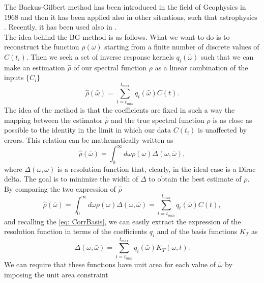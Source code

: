 \documentclass[a4paper,10pt]{article}
\begin{document}
The Backus-Gilbert method \cite{BG} has been introduced in the field of Geophysics in 1968  and then it has been applied also in other situations, such that astrophysics \cite{LoredoEpstein}. Recently, it has been used also in  \cite{Hansen}\cite{Brandt2015}\cite{Brandt2016}.\\
The idea behind the BG method is as follows. What we want to do is to reconstruct the function $\rho(\omega)$ starting from a finite number of discrete values of $C(t_i)$. Then we seek a set of inverse response kernels $q_i(\bar{\omega})$ such that we can make an estimation $\hat{\rho}$ of our spectral function $\rho$ as a linear combination of the inputs $\{C_i\}$ 
\begin{equation}
\hat{\rho}(\bar{\omega}) = \sum_{t=t_{min}}^{t_{max}} q_t(\bar{\omega})C(t). 
\end{equation}
The idea of the method is that the coefficients are fixed in such a way the mapping between the estimator $\hat{\rho}$ and the true spectral function $\rho$ is as close as possible to the identity in the limit in which our data $C(t_i)$ is unaffected by errors. This relation can be mathematically written as
\begin{equation}\label{Delta_est}
\hat{\rho}(\bar{\omega}) = \int_0^\infty d\omega \rho(\omega)\Delta(\omega, \bar{\omega}),
\end{equation}
where $\Delta(\omega, \bar{\omega})$ is a resolution function that, clearly, in the ideal case is a Dirac delta. The goal is to minimize the width of $\Delta$ to obtain the best estimate of $\rho$. By comparing the two expression of $\hat{\rho}$ 
\begin{equation}
\hat{\rho}(\bar{\omega}) = \int_0^\infty d\omega \rho(\omega)\Delta(\omega, \bar{\omega}) = \sum_{t=t_{min}}^{t_{max}} q_t(\bar{\omega})C(t), 
\end{equation}
and recalling the \eqref{eq: CorrBasis},  we can easily extract the expression of the resolution function in terms of the coefficients $q_i$ and of the basis functions $K_T$ as 
\begin{equation}\label{eq: res_sum}
\Delta(\omega,\bar{\omega}) = \sum_{t=t_{min}}^{t_{max}} q_i(\bar{\omega}) K_T(\omega,t).
\end{equation}
We can require that these functions have unit area for each value of $\bar{\omega}$  by imposing the unit area constraint
\end{document}
